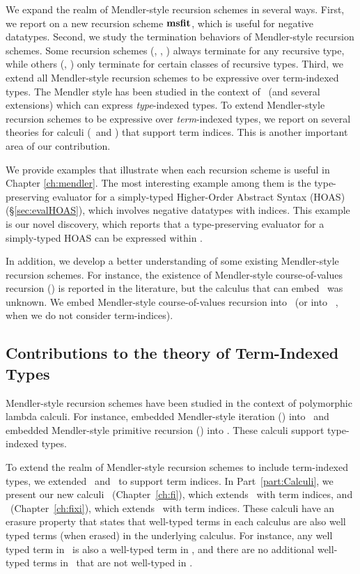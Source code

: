 We expand the realm of Mendler-style recursion schemes in several ways.
First, we report on a new recursion scheme $\mathbf{msfit}$, which is useful
for negative datatypes.  Second, we study the termination behaviors
of Mendler-style recursion schemes. Some recursion schemes (\eg, \MIt, \MsfIt)
always terminate for any recursive type, while others (\eg, \McvPr) only
terminate for certain classes of recursive types. Third, we extend
all Mendler-style recursion schemes to be expressive over term-indexed types.
The Mendler style has been studied in the context of \Fw\ (and several
extensions) which can express \emph{type}-indexed types. To extend Mendler-style
recursion schemes to be expressive over \emph{term}-indexed types, we report on
several theories for calculi (\Fi\ and \Fixi) that support term indices.
This is another important area of our contribution.

We provide examples that illustrate when each recursion scheme is useful
in Chapter \ref{ch:mendler}. The most interesting example among them is
the type-preserving evaluator for a simply-typed Higher-Order Abstract Syntax
(HOAS) (\S\ref{sec:evalHOAS}), which involves negative datatypes with indices.
This example is our novel discovery, which reports that
a type-preserving evaluator for a simply-typed HOAS can be expressed within \Fw.

In addition, we develop a better understanding of some existing
Mendler-style recursion schemes. For instance, the existence of
Mendler-style course-of-values recursion (\McvPr) is reported
in the literature, but the calculus that can embed \McvPr\ was unknown.
We embed Mendler-style course-of-values recursion into \Fixi\ 
(or into \Fixw\ \cite{AbeMat04}, when we do not consider term-indices).

\subsection{Contributions to the theory of Term-Indexed Types}
Mendler-style recursion schemes have been studied in the context of
polymorphic lambda calculi. For instance, \citet{AbeMatUus03} embedded 
Mendler-style iteration (\MIt) into \Fw\ and \citet{AbeMat04} embedded
Mendler-style primitive recursion (\MPr) into \Fixw. These calculi
support type-indexed types.

To extend the realm of Mendler-style recursion schemes to include
term-indexed types, we extended \Fw\ and \Fixw\ to support term indices.
In Part~\ref{part:Calculi}, we present our new calculi
\Fi\ (Chapter~\ref{ch:fi}), which extends \Fw\ with term indices, and
\Fixi\ (Chapter~\ref{ch:fixi}), which extends \Fixw\ with term indices.
These calculi have an erasure property that states that well-typed terms
in each calculus are also well typed terms (when erased) in the 
underlying calculus. For instance, any well typed term in \Fi\ is also
a well-typed term in \Fw, and there are no additional well-typed terms
in \Fi\ that are not well-typed in \Fw.

